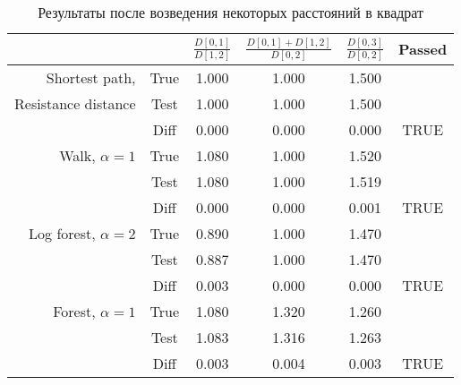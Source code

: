 \documentclass{article}
\begin{document}
\begin{table}[H]
  \caption{Результаты после возведения некоторых расстояний в квадрат}
  \begin{center}
    \begin{tabular}{rc|ccc|c}
                     &      & $\frac{D[0, 1]}{D[1, 2]}$ & $\frac{D[0, 1] + D[1, 2]}{D[0, 2]}$ & $\frac{D[0, 3]}{D[0, 2]}$ & Passed \\
                     \hline
Shortest path,        & True & 1.000                   & 1.000                                     & 1.500                   &        \\
Resistance distance & Test & 1.000                   & 1.000                                     & 1.500                   &        \\
                     & Diff & 0.000                   & 0.000                                     & 0.000                   & TRUE   \\
                     \hline
Walk, $\alpha=1$ & True & 1.080                   & 1.000                                     & 1.520                   &        \\
                     & Test & 1.080                   & 1.000                                     & 1.519                   &        \\
                     & Diff & 0.000                   & 0.000                                     & 0.001                   & TRUE   \\
                     \hline
Log forest, $\alpha=2$ & True & 0.890                   & 1.000                                     & 1.470                   &        \\
                     & Test & 0.887                   & 1.000                                     & 1.470                   &        \\
                     & Diff & 0.003                   & 0.000                                     & 0.000                   & TRUE   \\
                     \hline
Forest, $\alpha=1$ & True & 1.080                   & 1.320                                     & 1.260                   &        \\
                     & Test & 1.083                   & 1.316                                     & 1.263                   &        \\
                     & Diff & 0.003                   & 0.004                                     & 0.003                   & TRUE   \\

\end{tabular}
\end{center}
\end{table}
\end{document}
